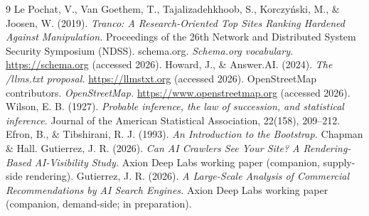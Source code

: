 \documentclass[11pt]{article}
\begin{document}
\begin{thebibliography}{9}
 Le Pochat, V., Van Goethem, T., Tajalizadehkhoob, S., Korczy\'{n}ski, M., \&
Joosen, W. (2019). \emph{Tranco: A Research-Oriented Top Sites Ranking Hardened Against
Manipulation.} Proceedings of the 26th Network and Distributed System Security Symposium (NDSS).
 schema.org. \emph{Schema.org vocabulary.} \url{https://schema.org} (accessed 2026).
 Howard, J., \& Answer.AI. (2024). \emph{The /llms.txt proposal.}
\url{https://llmstxt.org} (accessed 2026).
 OpenStreetMap contributors. \emph{OpenStreetMap.} \url{https://www.openstreetmap.org}
(accessed 2026).
 Wilson, E. B. (1927). \emph{Probable inference, the law of succession, and
statistical inference.} Journal of the American Statistical Association, 22(158), 209--212.
 Efron, B., \& Tibshirani, R. J. (1993). \emph{An Introduction to the Bootstrap.}
Chapman \& Hall.
 Gutierrez, J. R. (2026). \emph{Can AI Crawlers See Your Site? A Rendering-Based
AI-Visibility Study.} Axion Deep Labs working paper (companion, supply-side rendering).
 Gutierrez, J. R. (2026). \emph{A Large-Scale Analysis of Commercial Recommendations by
AI Search Engines.} Axion Deep Labs working paper (companion, demand-side; in preparation).
\end{thebibliography}
\end{document}
